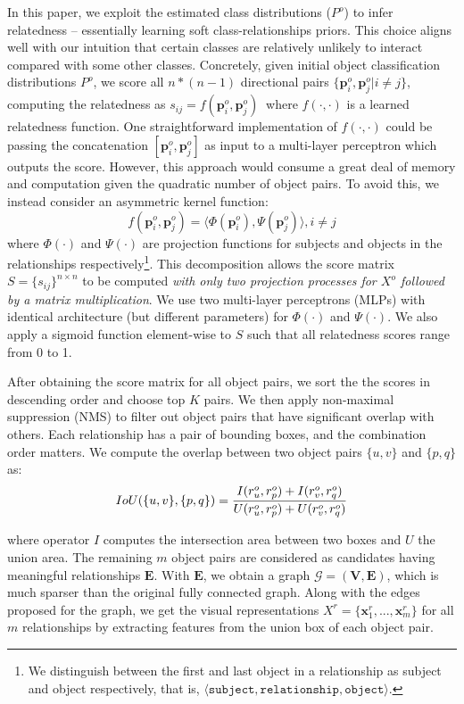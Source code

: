 In this paper, we exploit the estimated class distributions ($P^o$) to infer relatedness -- essentially learning soft class-relationships priors. This choice aligns well with our intuition that certain classes are relatively unlikely to interact compared with some other classes. Concretely, given initial object classification distributions $P^o$, we score all $n*(n-1)$ directional pairs $\{\bm{p}^o_i, \bm{p}^o_j | i\neq j\}$, computing the relatedness as $s_{ij} = f(\bm{p}^o_i, \bm{p}^o_j) ~$ where $f(\cdot, \cdot)$ is a learned relatedness function. One straightforward implementation of $f(\cdot,\cdot)$ could be passing the concatenation $[\bm{p}^o_i, \bm{p}^o_j]$ as input to a multi-layer perceptron which outputs the score. However, this approach would consume a great deal of memory and computation given the quadratic number of object pairs. To avoid this, we instead consider an asymmetric kernel function:
\begin{equation}
\mathit{f}(\bm{p}^o_i, \bm{p}^o_j) = \langle\Phi(\bm{p}^o_i), \Psi(\bm{p}^o_j)\rangle, i \neq j
\end{equation}
where $\Phi(\cdot)$ and $\Psi(\cdot)$ are projection functions for subjects and objects in the relationships respectively\footnote{We distinguish between the first and last object in a relationship as subject and object respectively, that is, $\langle \mathtt{subject, relationship, object}\rangle$.}. This decomposition allows the score matrix $S=\{s_{ij}\}^{n \times n}$ to be computed \emph{with only two projection processes for ${X}^o$ followed by a matrix multiplication}. We use two multi-layer perceptrons (MLPs) with identical architecture (but different parameters) for $\Phi(\cdot)$ and $\Psi(\cdot)$. We also apply a sigmoid function element-wise to $S$ such that all relatedness scores range from 0 to 1.

After obtaining the score matrix for all object pairs, we sort the the scores in descending order and choose top $K$ pairs. We then apply non-maximal suppression (NMS) to filter out object pairs that have significant overlap with others. Each relationship has a pair of bounding boxes, and the combination order matters. We compute the overlap between two object pairs $\{u, v\}$ and $\{p, q\}$ as:
\begin{equation}
\small
IoU(\{u, v\}, \{p, q\}) = \frac{I({r}^o_u, {r}^o_p) + I({r}^o_v, {r}^o_q)}{U({r}^o_u, {r}^o_p) + U({r}^o_v, {r}^o_q)}
\end{equation}

\noindent where operator $I$ computes the intersection area between two boxes and $U$ the union area. The remaining $m$ object pairs are considered as candidates having meaningful relationships $\bm{E}$. With $\bm{E}$, we obtain a graph $\mathcal{G} =\left( \bm{V}, \bm{E} \right)$, which is much sparser than the original fully connected graph. Along with the edges proposed for the graph, we get the visual representations $X^r=\{\bm{x}^r_1,...,\bm{x}^r_m\}$ for all $m$ relationships by extracting features from the union box of each object pair.

